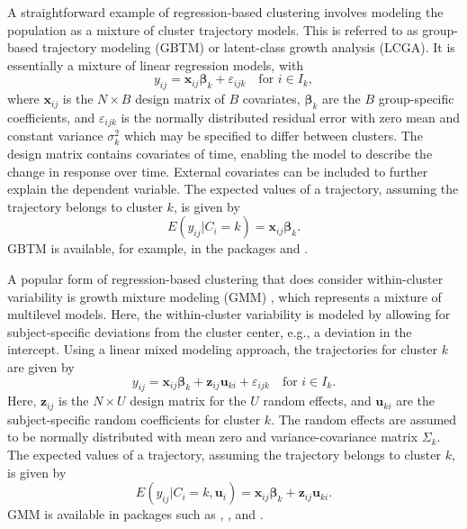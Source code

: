 A straightforward example of regression-based clustering involves modeling the population as a mixture of cluster trajectory models. This is referred to as group-based trajectory modeling (GBTM) or latent-class growth analysis (LCGA). It is essentially a mixture of linear regression models, with \begin{equation} \label{eqn:gbtm_y}
  y_{ij} = \mathbf{x}_{ij} \mathbf{\beta}_k + \varepsilon_{ijk} \quad \textrm{for } i \in I_k,
\end{equation} where \(\mathbf{x}_{ij}\) is the \(N \times B\) design matrix of \(B\) covariates, \(\mathbf{\beta}_k\) are the \(B\) group-specific coefficients, and \(\varepsilon_{ijk}\) is the normally distributed residual error with zero mean and constant variance \(\sigma_k^2\) which may be specified to differ between clusters. The design matrix contains covariates of time, enabling the model to describe the change in response over time. External covariates can be included to further explain the dependent variable. The expected values of a trajectory, assuming the trajectory belongs to cluster \(k\), is given by \begin{equation}
  \label{eqn:gbtm}
  E(y_{ij} | C_i = k) = \mathbf{x}_{ij} \mathbf{\beta}_k.
\end{equation} GBTM is available, for example, in the packages  \citep{proustlima2017estimation} and  \citep{Nielsen2018crimCV}.

A popular form of regression-based clustering that does consider within-cluster variability is growth mixture modeling (GMM) \citep{muthen2004latent}, which represents a mixture of multilevel models. Here, the within-cluster variability is modeled by allowing for subject-specific deviations from the cluster center, e.g., a deviation in the intercept. Using a linear mixed modeling approach, the trajectories for cluster \(k\) are given by \begin{equation}
  y_{ij} = \mathbf{x}_{ij} \mathbf{\beta}_k + \mathbf{z}_{ij} \mathbf{u}_{ki} + \varepsilon_{ijk} \quad \textrm{for } i \in I_k.
\end{equation} Here, \(\mathbf{z}_{ij}\) is the \(N \times U\) design matrix for the \(U\) random effects, and \(\mathbf{u}_{ki}\) are the subject-specific random coefficients for cluster \(k\). The random effects are assumed to be normally distributed with mean zero and variance-covariance matrix \(\Sigma_k\). The expected values of a trajectory, assuming the trajectory belongs to cluster \(k\), is given by \begin{equation}
  \label{eqn:gmm}
  E(y_{ij} | C_i = k, \mathbf{u}_{i}) = \mathbf{x}_{ij} \mathbf{\beta}_k + \mathbf{z}_{ij} \mathbf{u}_{ki}.
\end{equation} GMM is available in packages such as  \citep{proustlima2017estimation},  \citep{benaglia2009mixtools}, and  \citep{Komarek2009New}.

